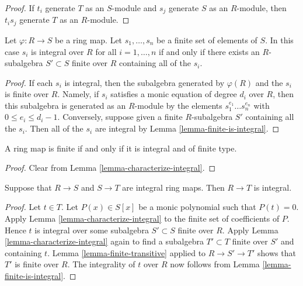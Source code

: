 \begin{proof}
If $t_i$ generate $T$ as an $S$-module and $s_j$ generate $S$ as an
$R$-module, then $t_i s_j$ generate $T$ as an $R$-module.
\end{proof}

\begin{lemma}
\label{lemma-characterize-integral}
Let $\varphi : R \to S$ be a ring map. Let $s_1, \ldots, s_n$
be a finite set of elements of $S$.
In this case $s_i$ is integral over $R$ for all $i = 1, \ldots, n$
if and only if
there exists an $R$-subalgebra $S' \subset S$ finite over $R$
containing all of the $s_i$.
\end{lemma}

\begin{proof}
If each $s_i$ is integral, then the subalgebra
generated by $\varphi(R)$ and the $s_i$ is finite
over $R$. Namely, if $s_i$ satisfies a monic equation
of degree $d_i$ over $R$, then this subalgebra is generated as an
$R$-module by the elements $s_1^{e_1} \ldots s_n^{e_n}$
with $0 \leq e_i \leq d_i - 1$.
Conversely, suppose given a finite $R$-subalgebra
$S'$ containing all the $s_i$. Then all of the
$s_i$ are integral by Lemma \ref{lemma-finite-is-integral}.
\end{proof}

\begin{lemma}
\label{lemma-characterize-finite-in-terms-of-integral}
A ring map is finite if and only if it is integral and
of finite type.
\end{lemma}

\begin{proof}
Clear from Lemma \ref{lemma-characterize-integral}.
\end{proof}

\begin{lemma}
\label{lemma-integral-transitive}
Suppose that $R \to S$ and $S \to T$ are integral
ring maps. Then $R \to T$ is integral.
\end{lemma}

\begin{proof}
Let $t \in T$. Let $P(x) \in S[x]$ be a
monic polynomial such that $P(t) = 0$.
Apply Lemma \ref{lemma-characterize-integral}
to the finite set of coefficients of $P$.
Hence $t$ is integral over some subalgebra
$S' \subset S$ finite over $R$. Apply Lemma
\ref{lemma-characterize-integral} again to find
a subalgebra $T' \subset T$ finite over $S'$ and
containing $t$. Lemma \ref{lemma-finite-transitive}
applied to $R \to S' \to T'$ shows that $T'$ is finite
over $R$. The integrality of $t$ over $R$
now follows from Lemma \ref{lemma-finite-is-integral}.
\end{proof}

